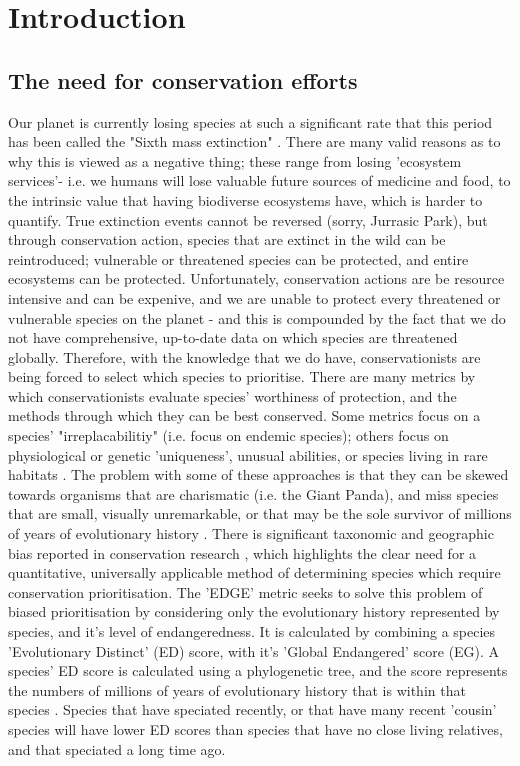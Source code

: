\documentclass[11pt]{article}
\begin{document}
	
	\section{Introduction}
	\noindent

\subsection{The need for conservation efforts }
Our planet is currently losing species at such a significant rate that this 
period has been called the "Sixth mass extinction" 
\autocite{Barnosky2011}. There are many valid reasons as to why this is viewed 
as a negative thing; these range from losing 'ecosystem services'- i.e. we 
humans will lose valuable future sources of medicine and food, to the 
intrinsic value that having biodiverse ecosystems have, which is harder to 
quantify. True extinction events cannot be reversed (sorry, Jurrasic Park), but 
through conservation action, species that are extinct in the wild can be 
reintroduced; vulnerable or threatened species can be protected, and entire 
ecosystems can be protected. Unfortunately, conservation actions are be 
resource intensive and can be expenive, and we are unable to protect every 
threatened or 
vulnerable species on the planet - and this is compounded by the fact that we 
do not have comprehensive, up-to-date data on which species are threatened 
globally. Therefore, with the knowledge that we do have, conservationists are 
being forced to select which species to prioritise. There are many metrics by 
which conservationists evaluate species' worthiness of protection, and the 
methods through which they can be best conserved. Some metrics focus on a 
species' "irreplacabilitiy" (i.e. focus on endemic species); others focus on 
physiological or genetic 'uniqueness', unusual abilities, or species living in 
rare habitats \autocite{Brooks2006}. The problem with some of these approaches 
is that they can be skewed towards organisms that are charismatic (i.e. the 
Giant Panda), and miss species that are small, visually unremarkable, or that 
may be the sole survivor of millions of years of evolutionary history 
\autocite{Clark2002}. There is significant taxonomic and geographic bias 
reported in conservation research \autocite{Clark2002, Darwall2011, 
Watson2017}, which highlights the clear need for a quantitative, universally 
applicable method of determining species which require conservation 
prioritisation.  The 
'EDGE' metric seeks to solve this problem of biased prioritisation by 
considering only the evolutionary history represented by species, and it's 
level of endangeredness. It is calculated by combining a species 'Evolutionary 
Distinct' (ED) score, with it's 'Global 
Endangered' score (EG). A species' ED score is calculated using a phylogenetic 
tree, and the score represents the numbers of millions of years of evolutionary 
history that is within that species \autocite{Isaac2007}. Species that have 
speciated recently, or that have many recent 'cousin' species will have lower 
ED scores than species that have no close living relatives, and that speciated 
a long time ago. 
\end{document}

